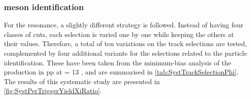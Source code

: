 %    
%    

\subsubsection{\rmPhiMes meson identification}

For the \rmPhiMes resonance, a slightly different strategy is followed. Instead of having four classes of cuts, each selection is varied one by one while keeping the others at their values. Therefore, a total of ten variations on the track selections are tested, complemented by four additional variants for the selections related to the particle identification. These have been taken from the minimum-bias analysis of the \rmPhiMes production in pp at \sqrtS = 13 \tev \cite{alicecollaborationMultiplicityDependence8922019}, and are summarised in \tab\ref{tab:SystTrackSelectionPhi}. The results of this systematic study are presented in \figs\ref{fig:SystPerTriggerYieldXiRatio}.

